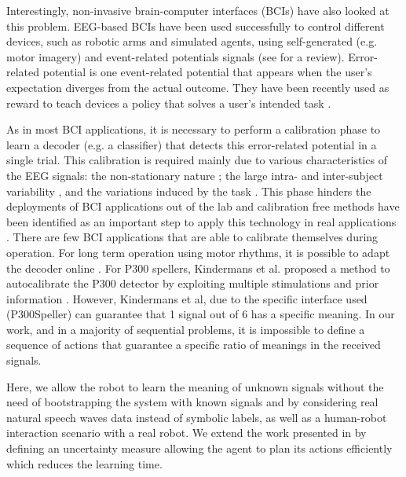 Interestingly, non-invasive brain-computer interfaces (BCIs) have also looked at this problem. EEG-based BCIs have been used successfully to control different devices, such as robotic arms and simulated agents, using self-generated (e.g. motor imagery) and event-related potentials signals (see \cite{millan10} for a review). 
%
Error-related potential is one event-related potential that appears when the user's expectation diverges from the actual outcome. They have been recently used as reward to teach devices a policy that solves a user's intended task \cite{chavarriaga2010learning,iturrate2010robot}.

As in most BCI applications, it is necessary to perform a calibration phase to learn a decoder (e.g. a classifier) that detects this error-related potential in a single trial. This calibration is required mainly due to various characteristics of the EEG signals: the non-stationary nature \cite{vidaurre11}; the large intra- and inter-subject variability \cite{Polich1997}, and the variations induced by the task \cite{iturrate2013task}. This phase hinders the deployments of BCI applications out of the lab and calibration free methods have been identified as an important step to apply this technology in real applications \cite{millan10}. 
There are few BCI applications that are able to calibrate themselves during operation.  For long term operation using motor rhythms, it is possible to adapt the decoder online \cite{vidaurre2010towards}. For P300 spellers, Kindermans et al. proposed a method to autocalibrate the P300 detector by exploiting multiple stimulations and prior information \cite{Kindermans2012a,Kindermans2012b}. However, Kindermans et al, due to the specific interface used (P300Speller) can guarantee that 1 signal out of 6 has a specific meaning. In our work, and in a majority of sequential problems, it is impossible to define a sequence of actions that guarantee a specific ratio of meanings in the received signals.

Here, we allow the robot to learn the meaning of unknown signals without the need of bootstrapping the system with known signals and by considering real natural speech waves data instead of symbolic labels, as well as a human-robot interaction scenario with a real robot. We extend the work presented in \cite{grizou2013robot} by defining an uncertainty measure allowing the agent to plan its actions efficiently which reduces the learning time.
